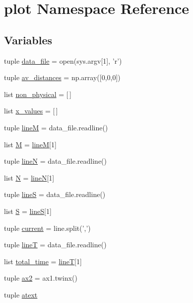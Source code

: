 \hypertarget{namespaceplot}{\section{plot Namespace Reference}
\label{namespaceplot}
}
\subsection*{Variables}
\begin{DoxyCompactItemize}
\item 
tuple \hyperlink{namespaceplot_a76604754d04d25d2ed09918540a6c70a}{data\+\_\+file} = open(sys.\+argv\mbox{[}1\mbox{]}, 'r')
\item 
tuple \hyperlink{namespaceplot_aa802f761d87c652c2b2d42d1df226cbe}{av\+\_\+distances} = np.\+array(\mbox{[}0,0,0\mbox{]})
\item 
list \hyperlink{namespaceplot_a3362f4ff1c2209b383471820c80e44e6}{non\+\_\+physical} = \mbox{[}$\,$\mbox{]}
\item 
list \hyperlink{namespaceplot_a2072124cc6ba55a01872b4b2c30b24e1}{x\+\_\+values} = \mbox{[}$\,$\mbox{]}
\item 
tuple \hyperlink{namespaceplot_a77186a44a4f6367fb7f0bb74ff404e18}{line\+M} = data\+\_\+file.\+readline()
\item 
list \hyperlink{namespaceplot_a61ca36fd897e468faeff5efacb7c8982}{M} = \hyperlink{namespaceplot_a77186a44a4f6367fb7f0bb74ff404e18}{line\+M}\mbox{[}1\mbox{]}
\item 
tuple \hyperlink{namespaceplot_a36ffd57cec3771249d4084c61ddf66c5}{line\+N} = data\+\_\+file.\+readline()
\item 
list \hyperlink{namespaceplot_aa0f86ba798722938f2b4e9b107b1fecb}{N} = \hyperlink{namespaceplot_a36ffd57cec3771249d4084c61ddf66c5}{line\+N}\mbox{[}1\mbox{]}
\item 
tuple \hyperlink{namespaceplot_a5ea77f461a65df196d3e8b9cb1f6907c}{line\+S} = data\+\_\+file.\+readline()
\item 
list \hyperlink{namespaceplot_a58c46b78fd9b0e96570078d06843cf55}{S} = \hyperlink{namespaceplot_a5ea77f461a65df196d3e8b9cb1f6907c}{line\+S}\mbox{[}1\mbox{]}
\item 
tuple \hyperlink{namespaceplot_ac521044b45248b4566a26825505c17ed}{current} = line.\+split(',')
\item 
tuple \hyperlink{namespaceplot_ac6d7b09f45c20812fc30774900d5a5ec}{line\+T} = data\+\_\+file.\+readline()
\item 
list \hyperlink{namespaceplot_a761ebcb8af2efb55c60cf9431dfb87a5}{total\+\_\+time} = \hyperlink{namespaceplot_ac6d7b09f45c20812fc30774900d5a5ec}{line\+T}\mbox{[}1\mbox{]}
\item 
tuple \hyperlink{namespaceplot_a1b4b1cb4d1fa8a5a42231982413b9a90}{ax2} = ax1.\+twinx()
\item 
tuple \hyperlink{namespaceplot_a73adf0d804e9c50fb4c9a8d30e6112f3}{atext}
\end{DoxyCompactItemize}


